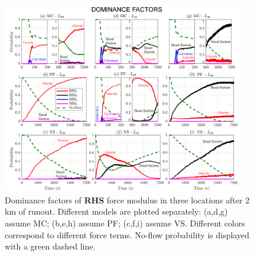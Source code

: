 \documentclass{article}
\begin{document}
\begin{figure}[H]
         \centering
        \includegraphics[width=0.95\textwidth]{BAF_VolcanDeColima/ForceContrib/Pr2_total.png}
        \caption{Dominance factors of \textbf{RHS} force modulus in three locations after 2 km of runout. Different models are plotted separately: (a,d,g) assume MC; (b,e,h) assume PF; (c,f,i) assume VS. Different colors correspond to different force terms. No-flow probability is displayed with a green dashed line.}
        \label{fig:Colima-Pr2}
\end{figure}
\end{document}

